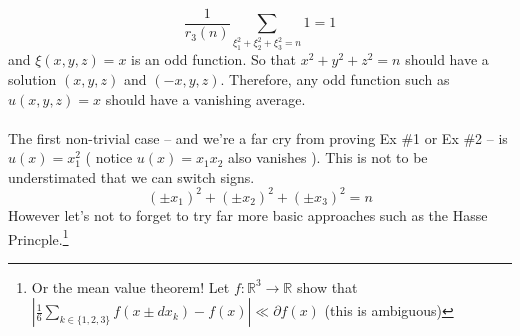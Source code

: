 \documentclass[12pt]{article}
\begin{document}
$$  \frac{1}{r_3(n)} \sum_{\xi_1^2 + \xi_2^2 + \xi_3^2 = n} 1 = 1  $$
and $\xi(x,y,z) = x$ is an odd function.  So that $x^2 + y^2 + z^2 = n$ should have a solution $(x,y,z)$ and $(-x,y,z)$.  Therefore, any odd function such as $u(x,y,z) = x$ should have a vanishing average.  \\ \\
The first non-trivial case -- and we're a far cry from proving Ex \#1 or Ex \#2 -- is $u(x) = x_1^2$ ( notice $u(x) = x_1 x_2$ also vanishes ).  This is not to be understimated that we can switch signs.
$$ (\pm x_1)^2 + (\pm x_2)^2 + (\pm x_3)^2 = n $$
However let's not to forget to try far more basic approaches such as the Hasse Princple.\footnote{Or the mean value theorem! Let $f: \mathbb{R}^3 \to \mathbb{R}$ show that $|\frac{1}{6}\sum_{k \in \{1,2,3\}} f(x \pm dx_k) - f(x)|\ll \partial f (x)$ (this is ambiguous)}

\newpage
\end{document}
